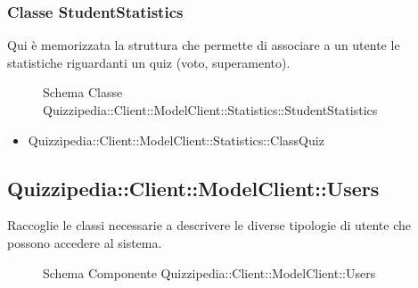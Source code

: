 \subsubsection{Classe StudentStatistics}
Qui è memorizzata la struttura che permette di associare a un utente le statistiche riguardanti un quiz (voto, superamento).
\begin{figure}[H]
\centering
\noindent{}
\caption{Schema Classe Quizzipedia::Client::ModelClient::Statistics::StudentStatistics}
\end{figure}
\begin{itemize}
\item Quizzipedia::Client::ModelClient::Statistics::ClassQuiz
\end{itemize}
\subsection{Quizzipedia::Client::ModelClient::Users}
Raccoglie le classi necessarie a descrivere le diverse tipologie di utente che possono accedere al sistema.
\begin{figure}[H]
\centering
\noindent{}
\caption[Quizzipedia::Client::ModelClient::Users]{Schema Componente Quizzipedia::Client::ModelClient::Users}
\end{figure}
